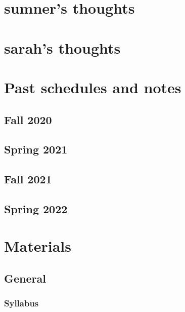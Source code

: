 \documentclass[12pt]{article}
\begin{document}
\newpage
\section{sumner's thoughts}

\section{sarah's thoughts}

\section{Past schedules and notes}
\subsection{Fall 2020}
\subsection{Spring 2021}
\subsection{Fall 2021}
\subsection{Spring 2022}

\newpage
\section{Materials}
\subsection{General}
\subsubsection{Syllabus}
\end{document}
